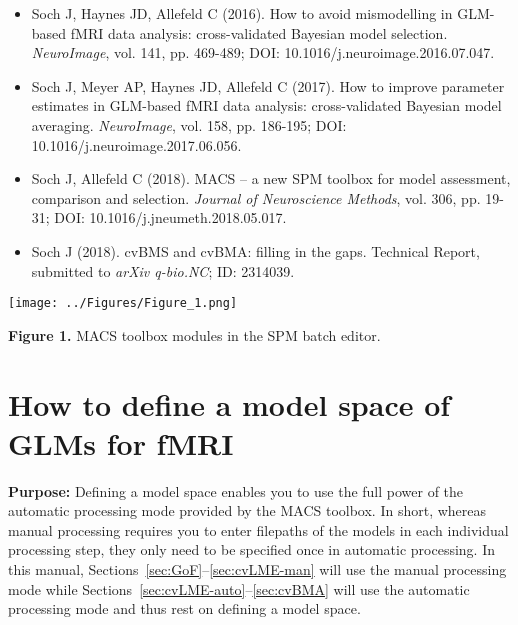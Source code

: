 \documentclass[a4paper,12pt]{article}
\begin{document}
\begin{itemize}

\item
Soch J, Haynes JD, Allefeld C (2016). How to avoid mismodelling in GLM-based fMRI data analysis: cross-validated Bayesian model selection. \textit{NeuroImage}, vol. 141, pp. 469-489; DOI: 10.1016/j.neuroimage.2016.07.047.

\item
Soch J, Meyer AP, Haynes JD, Allefeld C (2017). How to improve parameter estimates in GLM-based fMRI data analysis: cross-validated Bayesian model averaging. \textit{NeuroImage}, vol. 158, pp. 186-195; DOI: 10.1016/j.neuroimage.2017.06.056.

\item
Soch J, Allefeld C (2018). MACS – a new SPM toolbox for model assessment, comparison and selection. \textit{Journal of Neuroscience Methods}, vol. 306, pp. 19-31; DOI: 10.1016/j.jneumeth.2018.05.017.

\item
Soch J (2018). cvBMS and cvBMA: filling in the gaps. Technical Report, submitted to \textit{arXiv q-bio.NC}; ID: 2314039.

\end{itemize}

\vspace{1em}
\begin{flushleft}
\texttt{[image: ../Figures/Figure\_1.png]}
\end{flushleft}
\vspace{-1em}

\textbf{Figure 1.} MACS toolbox modules in the SPM batch editor.



\pagebreak
\section{How to define a model space of GLMs for fMRI} \label{sec:MS}

\textbf{Purpose:} Defining a model space enables you to use the full power of the automatic processing mode provided by the MACS toolbox. In short, whereas manual processing requires you to enter filepaths of the models in each individual processing step, they only need to be specified once in automatic processing. In this manual, Sections~\ref{sec:GoF}--\ref{sec:cvLME-man} will use the manual processing mode while Sections~\ref{sec:cvLME-auto}--\ref{sec:cvBMA} will use the automatic processing mode and thus rest on defining a model space.
\end{document}
